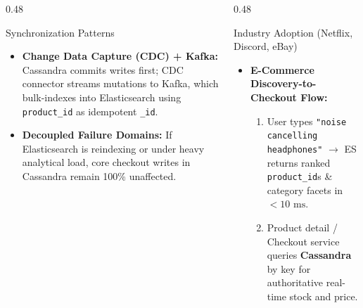 \documentclass[aspectratio=169]{beamer}
\begin{document}
\begin{frame}
\vspace{0.1cm}
\begin{columns}[T]
\begin{column}{0.48\textwidth}
\begin{block}{\scriptsize Synchronization Patterns}
\scriptsize
\begin{itemize}
    \item \textbf{Change Data Capture (CDC) + Kafka:} Cassandra commits writes first; CDC connector streams mutations to Kafka, which bulk-indexes into Elasticsearch using \texttt{product\_id} as idempotent \texttt{\_id}.
    \item \textbf{Decoupled Failure Domains:} If Elasticsearch is reindexing or under heavy analytical load, core checkout writes in Cassandra remain 100\% unaffected.
\end{itemize}
\end{block}
\end{column}
\begin{column}{0.48\textwidth}
\begin{block}{\scriptsize Industry Adoption (Netflix, Discord, eBay)}
\scriptsize
\begin{itemize}
    \item \textbf{E-Commerce Discovery-to-Checkout Flow:}
    \begin{enumerate}
        \scriptsize
        \item User types \texttt{"noise cancelling headphones"} $\rightarrow$ ES returns ranked \texttt{product\_id}s \& category facets in $<10\text{ ms}$.
        \item Product detail / Checkout service queries \textbf{Cassandra} by key for authoritative real-time stock and price.
    \end{enumerate}
\end{itemize}
\end{block}
\end{column}
\end{columns}
\end{frame}
\end{document}
